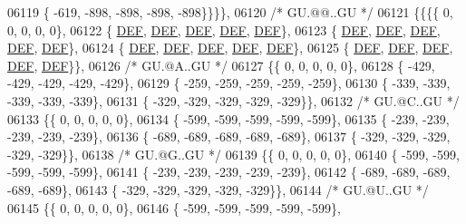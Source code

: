 \begin{DoxyCode}
06119 \{ -619, -898, -898, -898, -898\}\}\}\},
06120 \textcolor{comment}{/* GU.@@..GU */}
06121 \{\{\{\{    0,    0,    0,    0,    0\},
06122 \{  \mbox{\hyperlink{1_88_84__epars_8h_a397419fc12b37ed479c8abb9d444d843}{DEF}},  \mbox{\hyperlink{1_88_84__epars_8h_a397419fc12b37ed479c8abb9d444d843}{DEF}},  \mbox{\hyperlink{1_88_84__epars_8h_a397419fc12b37ed479c8abb9d444d843}{DEF}},  \mbox{\hyperlink{1_88_84__epars_8h_a397419fc12b37ed479c8abb9d444d843}{DEF}},  \mbox{\hyperlink{1_88_84__epars_8h_a397419fc12b37ed479c8abb9d444d843}{DEF}}\},
06123 \{  \mbox{\hyperlink{1_88_84__epars_8h_a397419fc12b37ed479c8abb9d444d843}{DEF}},  \mbox{\hyperlink{1_88_84__epars_8h_a397419fc12b37ed479c8abb9d444d843}{DEF}},  \mbox{\hyperlink{1_88_84__epars_8h_a397419fc12b37ed479c8abb9d444d843}{DEF}},  \mbox{\hyperlink{1_88_84__epars_8h_a397419fc12b37ed479c8abb9d444d843}{DEF}},  \mbox{\hyperlink{1_88_84__epars_8h_a397419fc12b37ed479c8abb9d444d843}{DEF}}\},
06124 \{  \mbox{\hyperlink{1_88_84__epars_8h_a397419fc12b37ed479c8abb9d444d843}{DEF}},  \mbox{\hyperlink{1_88_84__epars_8h_a397419fc12b37ed479c8abb9d444d843}{DEF}},  \mbox{\hyperlink{1_88_84__epars_8h_a397419fc12b37ed479c8abb9d444d843}{DEF}},  \mbox{\hyperlink{1_88_84__epars_8h_a397419fc12b37ed479c8abb9d444d843}{DEF}},  \mbox{\hyperlink{1_88_84__epars_8h_a397419fc12b37ed479c8abb9d444d843}{DEF}}\},
06125 \{  \mbox{\hyperlink{1_88_84__epars_8h_a397419fc12b37ed479c8abb9d444d843}{DEF}},  \mbox{\hyperlink{1_88_84__epars_8h_a397419fc12b37ed479c8abb9d444d843}{DEF}},  \mbox{\hyperlink{1_88_84__epars_8h_a397419fc12b37ed479c8abb9d444d843}{DEF}},  \mbox{\hyperlink{1_88_84__epars_8h_a397419fc12b37ed479c8abb9d444d843}{DEF}},  \mbox{\hyperlink{1_88_84__epars_8h_a397419fc12b37ed479c8abb9d444d843}{DEF}}\}\},
06126 \textcolor{comment}{/* GU.@A..GU */}
06127 \{\{    0,    0,    0,    0,    0\},
06128 \{ -429, -429, -429, -429, -429\},
06129 \{ -259, -259, -259, -259, -259\},
06130 \{ -339, -339, -339, -339, -339\},
06131 \{ -329, -329, -329, -329, -329\}\},
06132 \textcolor{comment}{/* GU.@C..GU */}
06133 \{\{    0,    0,    0,    0,    0\},
06134 \{ -599, -599, -599, -599, -599\},
06135 \{ -239, -239, -239, -239, -239\},
06136 \{ -689, -689, -689, -689, -689\},
06137 \{ -329, -329, -329, -329, -329\}\},
06138 \textcolor{comment}{/* GU.@G..GU */}
06139 \{\{    0,    0,    0,    0,    0\},
06140 \{ -599, -599, -599, -599, -599\},
06141 \{ -239, -239, -239, -239, -239\},
06142 \{ -689, -689, -689, -689, -689\},
06143 \{ -329, -329, -329, -329, -329\}\},
06144 \textcolor{comment}{/* GU.@U..GU */}
06145 \{\{    0,    0,    0,    0,    0\},
06146 \{ -599, -599, -599, -599, -599\},

\end{DoxyCode}
